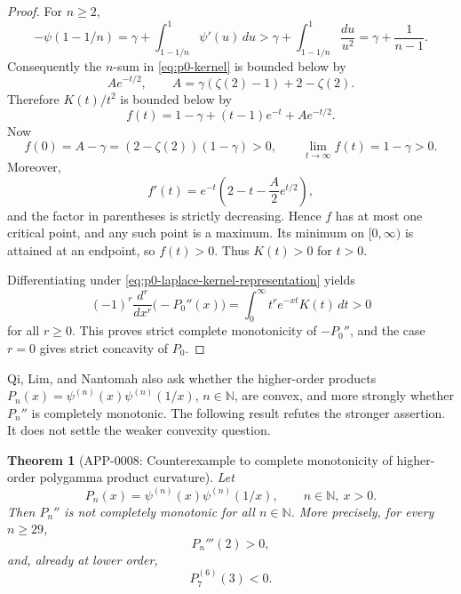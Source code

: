 \documentclass[11pt]{article}
\numberwithin{equation}{section}
\newtheorem{theorem}{Theorem}[section]
\theoremstyle{definition}
\theoremstyle{remark}
\newcommand{\N}{\mathbb N}
\newcommand{\1}{\mathbf 1}
\begin{document}
\begin{proof}
For \(n\ge2\),
\begin{equation}
\label{eq:p0-minus-psi-lower}
-\psi(1-1/n)
=\gamma+\int_{1-1/n}^{1}\psi'(u)\,du
>\gamma+\int_{1-1/n}^{1}\frac{du}{u^2}
=\gamma+\frac1{n-1}.
\end{equation}
Consequently the \(n\)-sum in \eqref{eq:p0-kernel} is bounded below by
\begin{equation}
\label{eq:p0-n-sum-lower}
Ae^{-t/2},
\qquad
A=\gamma(\zeta(2)-1)+2-\zeta(2).
\end{equation}
Therefore \(K(t)/t^2\) is bounded below by
\begin{equation}
\label{eq:p0-f-lower}
f(t)=1-\gamma+(t-1)e^{-t}+Ae^{-t/2}.
\end{equation}
Now
\begin{equation}
\label{eq:p0-f-endpoints}
f(0)=A-\gamma=(2-\zeta(2))(1-\gamma)>0,
\qquad
\lim_{t\to\infty}f(t)=1-\gamma>0.
\end{equation}
Moreover,
\begin{equation}
\label{eq:p0-f-derivative}
f'(t)=e^{-t}\left(2-t-\frac{A}{2}e^{t/2}\right),
\end{equation}
and the factor in parentheses is strictly decreasing.  Hence \(f\) has at most one critical point, and any such point is a maximum.  Its minimum on \([0,\infty)\) is attained at an endpoint, so \(f(t)>0\).  Thus \(K(t)>0\) for \(t>0\).

Differentiating under \eqref{eq:p0-laplace-kernel-representation} yields
\begin{equation}
\label{eq:p0-complete-monotonicity}
(-1)^r\frac{d^r}{dx^r}\bigl(-P_0''(x)\bigr)
=\int_0^\infty t^r e^{-xt}K(t)\,dt>0
\end{equation}
for all \(r\ge0\).  This proves strict complete monotonicity of \(-P_0''\), and the case \(r=0\) gives strict concavity of \(P_0\).
\end{proof}

Qi, Lim, and Nantomah also ask whether the higher-order products \(P_n(x)=\psi^{(n)}(x)\psi^{(n)}(1/x)\), \(n\in\N\), are convex, and more strongly whether \(P_n''\) is completely monotonic.  The following result refutes the stronger assertion.  It does not settle the weaker convexity question.

\begin{theorem}[APP-0008: Counterexample to complete monotonicity of higher-order polygamma product curvature]
\label{thm:pn-complete-monotonicity-counterexample}
Let
\begin{equation}
\label{eq:pn-product}
P_n(x)=\psi^{(n)}(x)\psi^{(n)}(1/x),\qquad n\in\N,\ x>0.
\end{equation}
Then \(P_n''\) is not completely monotonic for all \(n\in\N\).  More precisely, for every \(n\ge29\),
\begin{equation}
\label{eq:pn-high-order-third-positive}
P_n'''(2)>0,
\end{equation}
and, already at lower order,
\begin{equation}
\label{eq:p7-sixth-negative}
P_7^{(6)}(3)<0.
\end{equation}
\end{theorem}
\end{document}
